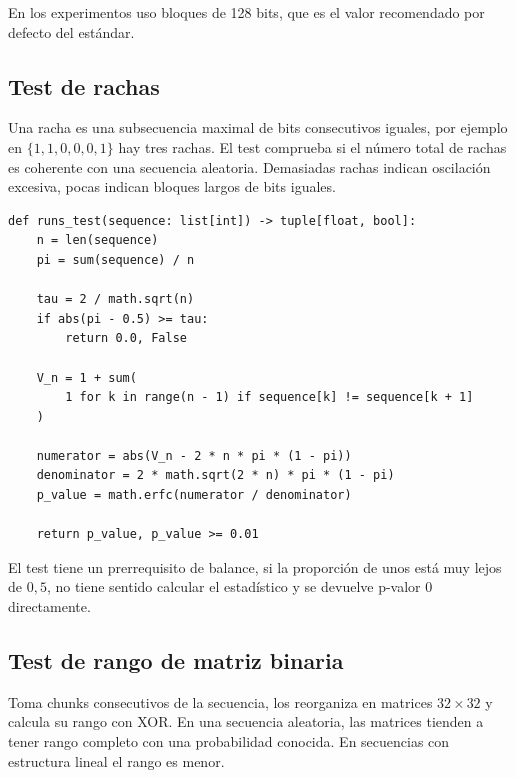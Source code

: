 En los experimentos uso bloques de 128 bits, que es el valor recomendado por defecto del estándar.

\subsection{Test de rachas}

Una racha es una subsecuencia maximal de bits consecutivos iguales,
por ejemplo en $\{1, 1, 0, 0, 0, 1\}$ hay tres rachas.
El test comprueba si el número total de rachas es coherente con una secuencia aleatoria.
Demasiadas rachas indican oscilación excesiva, pocas indican bloques largos de bits iguales.

\begin{lstlisting}[style=Python,caption={Test de rachas (\texttt{src/tests\_nist/runs.py}).}]
def runs_test(sequence: list[int]) -> tuple[float, bool]:
    n = len(sequence)
    pi = sum(sequence) / n

    tau = 2 / math.sqrt(n)
    if abs(pi - 0.5) >= tau:
        return 0.0, False

    V_n = 1 + sum(
        1 for k in range(n - 1) if sequence[k] != sequence[k + 1]
    )

    numerator = abs(V_n - 2 * n * pi * (1 - pi))
    denominator = 2 * math.sqrt(2 * n) * pi * (1 - pi)
    p_value = math.erfc(numerator / denominator)

    return p_value, p_value >= 0.01
\end{lstlisting}

El test tiene un prerrequisito de balance, si la proporción de unos está muy lejos de $0{,}5$,
no tiene sentido calcular el estadístico y se devuelve p-valor 0 directamente.

\subsection{Test de rango de matriz binaria}

Toma chunks consecutivos de la secuencia, los reorganiza en matrices $32 \times 32$ y calcula su rango con XOR.
En una secuencia aleatoria, las matrices tienden a tener rango completo con una probabilidad conocida.
En secuencias con estructura lineal el rango es menor.

